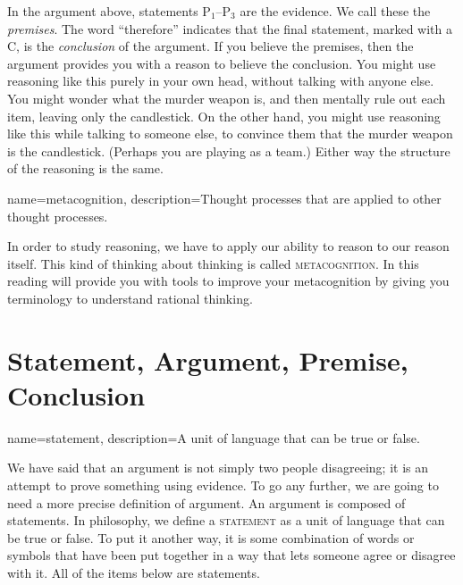 In the argument above, statements P$_1$--P$_3$ are the evidence. We call these the \emph{premises}. The word ``therefore'' indicates that the final statement, marked with a C, is the \emph{conclusion} of the argument. If you believe the premises, then the argument provides you with a reason to believe the conclusion. You might use reasoning like this purely in your own head, without talking with anyone else. You might wonder what the murder weapon is, and then mentally rule out each item, leaving only the candlestick. On the other hand, you might use reasoning like this while talking to someone else, to convince them that the murder weapon is the candlestick. (Perhaps you are playing as a team.) Either way the structure of the reasoning is the same. 



{
name=metacognition,
description={Thought processes that are applied to other thought processes.}
}

In order to study reasoning, we have to apply our ability to reason to our reason itself. This kind of thinking about thinking is called \textsc{\gls{metacognition}}\label{def:Metacognition}. In this reading will provide you with tools to improve your metacognition by giving you terminology to understand rational thinking.



\section{Statement, Argument, Premise, Conclusion}
\label{sec:SAPC}

{
name=statement,
description={A unit of language that can be true or false.}
}

We have said that an argument is not simply two people disagreeing; it is an attempt to prove something using evidence. To go any further, we are going to need a more precise definition of argument. An argument is composed of statements. In philosophy, we define a \textsc{\gls{statement}} \label{def:statement} as a unit of language that can be true or false. To put it another way, it is some combination of words or symbols that have been put together in a way that lets someone agree or disagree with it. All of the items below are statements.

